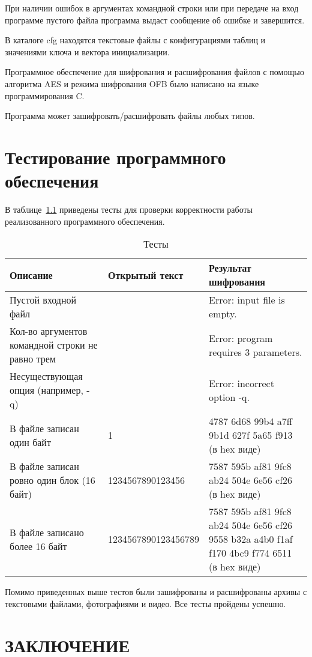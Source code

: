 \documentclass{bmstu}
\begin{document}
При наличии ошибок в аргументах командной строки или при передаче на вход программе пустого файла программа выдаст сообщение об ошибке и завершится.

В каталоге cfg находятся текстовые файлы с конфигурациями таблиц и значениями ключа и вектора инициализации.

Программное обеспечение для шифрования и расшифрования файлов с помощью алгоритма AES и режима шифрования OFB было написано на языке программирования C.

Программа может зашифровать/расшифровать файлы любых типов.

\chapter{Тестирование программного обеспечения}

В таблице~\ref{tabular:tests} приведены тесты для проверки корректности работы реализованного программного обеспечения.

\begin{table}[H]
\caption{Тесты}
\label{tabular:tests}
\begin{tabular}{|p{4cm}|p{5cm}|p{6cm}|}
\hline
\textbf{Описание} & \textbf{Открытый текст} & \textbf{Результат шифрования}
\tabularnewline
\hline
Пустой входной файл & & Error: input file is empty.
\tabularnewline
\hline
Кол-во аргументов командной строки не равно трем & & Error: program requires 3 parameters.
\tabularnewline
\hline
Несуществующая опция (например, -q) & & Error: incorrect option -q.
\tabularnewline
\hline
В файле записан один байт & 1 & 4787 6d68 99b4 a7ff 9b1d 627f 5a65 f913 (в hex виде)
\tabularnewline
\hline
В файле записан ровно один блок (16 байт) & 1234567890123456 & 7587 595b af81 9fc8 ab24 504e 6e56 cf26 (в hex виде)
\tabularnewline
\hline
В файле записано более 16 байт & 1234567890123456789 & 7587 595b af81 9fc8 ab24 504e 6e56 cf26 9558 b32a a4b0 f1af f170 4bc9 f774 6511 (в hex виде)
\tabularnewline
\hline
\end{tabular}
\end{table}

Помимо приведенных выше тестов были зашифрованы и расшифрованы архивы с текстовыми файлами, фотографиями и видео. 
Все тесты пройдены успешно.

{\centering \chapter*{ЗАКЛЮЧЕНИЕ}}
\end{document}

